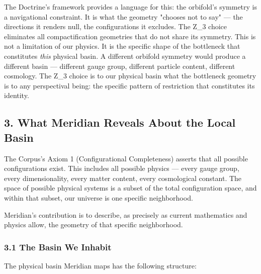 The Doctrine's framework provides a language for this: the orbifold's symmetry is a navigational constraint. It is what the geometry "chooses not to say" — the directions it renders null, the configurations it excludes. The Z\_3 choice eliminates all compactification geometries that do not share its symmetry. This is not a limitation of our physics. It is the specific shape of the bottleneck that constitutes \textit{this} physical basin. A different orbifold symmetry would produce a different basin — different gauge group, different particle content, different cosmology. The Z\_3 choice is to our physical basin what the bottleneck geometry is to any perspectival being: the specific pattern of restriction that constitutes its identity.


\bigskip\noindent\makebox[\textwidth]{\color{rulegray}\rule{5cm}{0.3pt}}\bigskip


\subsection*{3. What Meridian Reveals About the Local Basin}


The Corpus's Axiom 1 (Configurational Completeness) asserts that all possible configurations exist. This includes all possible physics — every gauge group, every dimensionality, every matter content, every cosmological constant. The space of possible physical systems is a subset of the total configuration space, and within that subset, our universe is one specific neighborhood.


Meridian's contribution is to describe, as precisely as current mathematics and physics allow, the geometry of that specific neighborhood.


\subsubsection*{3.1 The Basin We Inhabit}


The physical basin Meridian maps has the following structure:


